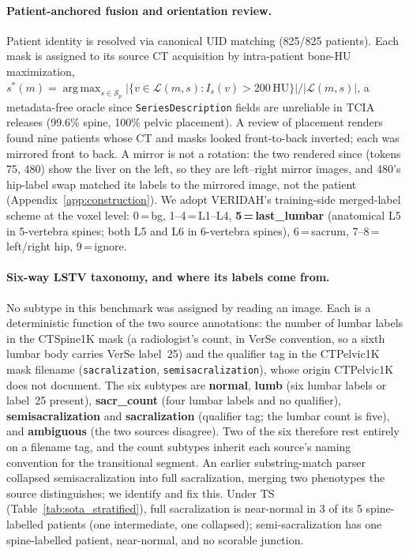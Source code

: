 \documentclass{article}
\DeclareMathOperator*{\argmax}{arg\,max}
\newcommand{\sota}{TS}
\newcommand{\VERIDAH}{VERIDAH}
\newcommand{\VerSe}{VerSe}
\begin{document}
\paragraph{Patient-anchored fusion and orientation
review.} Patient identity is resolved via canonical UID
matching (825/825 patients). Each mask is assigned to its
source CT acquisition by intra-patient bone-HU
maximization,
$s^*(m) = \argmax_{s \in \mathcal{S}_p}
|\{v \in \mathcal{L}(m, s) : I_s(v) > 200\,\text{HU}\}|/|\mathcal{L}(m, s)|$,
a metadata-free oracle since \texttt{SeriesDescription}
fields are unreliable in TCIA releases (99.6\% spine,
100\% pelvic placement). A review of placement renders
found nine patients whose CT and masks looked
front-to-back inverted; each was mirrored front to back.
A mirror is not a rotation: the two rendered since (tokens
75, 480) show the liver on the left, so they are
left--right mirror images, and 480's hip-label swap
matched its labels to the mirrored image, not the patient
(Appendix~\ref{app:construction}). We adopt
\VERIDAH{}'s training-side merged-label scheme at the
voxel level: 0\,=\,bg, 1--4\,=\,L1--L4,
\textbf{5\,=\,last\_lumbar} (anatomical L5 in 5-vertebra
spines; both L5 and L6 in 6-vertebra spines), 6\,=\,sacrum,
7--8\,=\,left/right hip, 9\,=\,ignore.

\paragraph{Six-way LSTV taxonomy, and where its labels come
from.} No subtype in this benchmark was assigned by reading
an image. Each is a deterministic function of the two
source annotations: the number of lumbar labels in the
CTSpine1K mask (a radiologist's count, in \VerSe{}
convention, so a sixth lumbar body carries \VerSe{}
label~25) and the qualifier tag in the CTPelvic1K mask
filename (\texttt{sacralization},
\texttt{semisacralization}), whose origin CTPelvic1K does
not document. The six subtypes are
\textbf{normal}, \textbf{lumb} (six lumbar labels or
label~25 present), \textbf{sacr\_count} (four lumbar labels
and no qualifier), \textbf{semisacralization} and
\textbf{sacralization} (qualifier tag; the lumbar count is
five), and \textbf{ambiguous} (the two sources disagree).
Two of the six therefore rest entirely on a filename tag,
and the count subtypes inherit each source's naming
convention for the transitional segment. An earlier
substring-match parser collapsed semisacralization into
full sacralization, merging two phenotypes the source
distinguishes; we identify and fix this. Under \sota{}
(Table~\ref{tab:sota_stratified}), full sacralization is
near-normal in 3 of its 5 spine-labelled patients (one
intermediate, one collapsed); semi-sacralization has one
spine-labelled patient, near-normal, and no scorable
junction.
\end{document}
